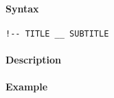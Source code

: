 


	\paragraph{Syntax}

\begin{verbatim}
!-- TITLE __ SUBTITLE
\end{verbatim}

\paragraph{Description}

\paragraph{Example}


